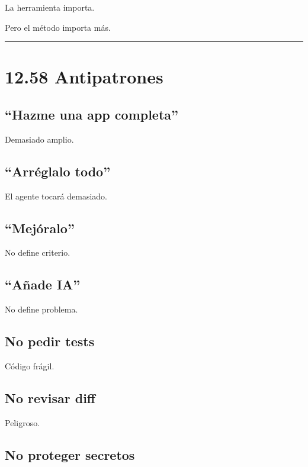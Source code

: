 La herramienta importa.

Pero el método importa más.

\begin{center}\rule{0.5\linewidth}{0.5pt}\end{center}

\section{12.58 Antipatrones}\label{antipatrones-1}

\subsection{``Hazme una app completa''}\label{hazme-una-app-completa}

Demasiado amplio.

\subsection{``Arréglalo todo''}\label{arruxe9glalo-todo}

El agente tocará demasiado.

\subsection{``Mejóralo''}\label{mejuxf3ralo}

No define criterio.

\subsection{``Añade IA''}\label{auxf1ade-ia}

No define problema.

\subsection{No pedir tests}\label{no-pedir-tests}

Código frágil.

\subsection{No revisar diff}\label{no-revisar-diff}

Peligroso.

\subsection{No proteger secretos}\label{no-proteger-secretos}


